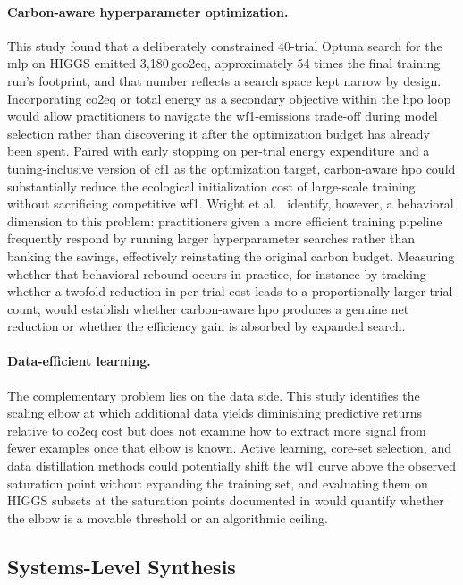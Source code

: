 \paragraph{Carbon-aware hyperparameter optimization.}
This study found that a deliberately constrained 40-trial Optuna search for the \gls{mlp} on HIGGS emitted 3{,}180\,\gls{gco2eq}, approximately 54 times the final training run's footprint, and that number reflects a search space kept narrow by design. Incorporating \gls{co2eq} or total energy as a secondary objective within the \gls{hpo} loop would allow practitioners to navigate the \gls{wf1}-emissions trade-off during model selection rather than discovering it after the optimization budget has already been spent. Paired with early stopping on per-trial energy expenditure and a tuning-inclusive version of \gls{cf1} as the optimization target, carbon-aware \gls{hpo} could substantially reduce the ecological initialization cost of large-scale training without sacrificing competitive \gls{wf1}. Wright et al.\ \parencite{wrightEfficiencyNotEnough2025} identify, however, a behavioral dimension to this problem: practitioners given a more efficient training pipeline frequently respond by running larger hyperparameter searches rather than banking the savings, effectively reinstating the original carbon budget. Measuring whether that behavioral rebound occurs in practice, for instance by tracking whether a twofold reduction in per-trial cost leads to a proportionally larger trial count, would establish whether carbon-aware \gls{hpo} produces a genuine net reduction or whether the efficiency gain is absorbed by expanded search.

\paragraph{Data-efficient learning.}
The complementary problem lies on the data side. This study identifies the scaling elbow at which additional data yields diminishing predictive returns relative to \gls{co2eq} cost but does not examine how to extract more signal from fewer examples once that elbow is known. Active learning, core-set selection, and data distillation methods could potentially shift the \gls{wf1} curve above the observed saturation point without expanding the training set, and evaluating them on HIGGS subsets at the saturation points documented in  would quantify whether the elbow is a movable threshold or an algorithmic ceiling.

\subsection{Systems-Level Synthesis}

